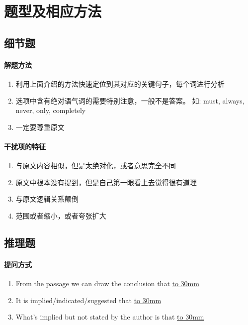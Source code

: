 \documentclass[a4paper]{ctexart}
\begin{document}
\section{题型及相应方法}
\subsection{细节题}
\paragraph{解题方法}
\begin{enumerate}
    \item 利用上面介绍的方法快速定位到其对应的关键句子，每个词进行分析
    \item 选项中含有绝对语气词的需要特别注意，一般不是答案。 如: must, always, never, only, completely
    \item 一定要尊重原文
\end{enumerate}

\paragraph{干扰项的特征}

\begin{enumerate}
    \item 与原文内容相似，但是太绝对化，或者意思完全不同
    \item 原文中根本没有提到，但是自己第一眼看上去觉得很有道理
    \item 与原文逻辑关系颠倒
    \item 范围或者缩小，或者夸张扩大
\end{enumerate}

\subsection{推理题}
\paragraph{提问方式}

\begin{enumerate}
    \item From the passage we can draw the conclusion that \underline{\hbox to 30mm{}} 
    \item It is implied/indicated/suggested that \underline{\hbox to 30mm{}} 
    \item What's implied but not stated by the author is that \underline{\hbox to 30mm{}} 
\end{enumerate}
\end{document}
